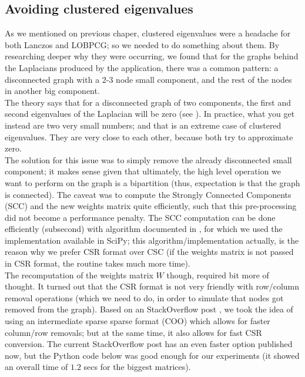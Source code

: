 \subsection{Avoiding clustered eigenvalues}

As we mentioned on previous chaper, clustered eigenvalues were a
headache for both Lanczos and LOBPCG; so we needed to do something
about them. By researching deeper why they were occurring, we found
that for the graphs behind the Laplacians produced by the
application, there was a common pattern: a disconnected graph with a
2-3 node small component, and the rest of the nodes in another big
component. \\

The theory says that for a disconnected graph of two components, the
first and second eigenvalues of the Laplacian will be zero (see
\cite{luxburg07}). In practice, what you get instead are two very
small numbers; and that is an extreme case of clustered
eigenvalues. They are very close to each other, because both try to
approximate zero. \\

The solution for this issue was to simply remove the already
disconnected small component; it makes sense given that ultimately,
the high level operation we want to perform on the graph is a
bipartition (thus, expectation is that the graph is connected). The
caveat was to compute the Strongly Connected Components (SCC) and the
new weights matrix quite efficiently, such that this pre-processing
did not become a performance penalty. The SCC computation can be done
efficiently (subsecond) with algorithm documented in \cite{pearce05},
for which we used the implementation available in SciPy; this
algorithm/implementation actually, is the reason why we prefer CSR
format over CSC (if the weights matrix is not passed in CSR format,
the routine takes much more time). \\

The recomputation of the weights matrix $W$ though, required bit more
of thought. It turned out that the CSR format is not very friendly
with row/column removal operations (which we need to do, in order to
simulate that nodes got removed from the graph). Based on an
StackOverflow post \cite{alim15}, we took the idea of using an
intermediate sparse sparse format (COO) which allows for faster
column/row removals; but at the same time, it also allows for fast CSR
conversion. The current StackOverflow post has an even faster option
published now, but the Python code below was good enough for our
experiments (it showed an overall time of $1.2$ secs for the biggest
matrices). \\


